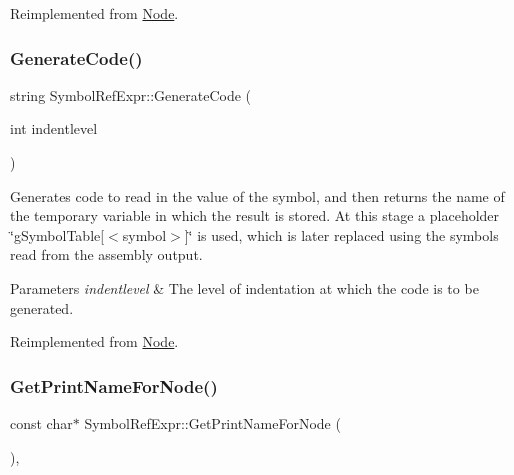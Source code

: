 Reimplemented from \hyperlink{class_node_a5f88d55c6f253a29def7ccc443d83d47}{Node}.

\mbox{\label{class_symbol_ref_expr_a05ae76345e624e5c7085f49707685c6e}} 
\subsubsection{\texorpdfstring{Generate\+Code()}{GenerateCode()}}
{\footnotesize\ttfamily string Symbol\+Ref\+Expr\+::\+Generate\+Code (\begin{DoxyParamCaption}\item[{int}]{indentlevel }\end{DoxyParamCaption})\hspace{0.3cm}{\ttfamily [virtual]}}

Generates code to read in the value of the symbol, and then returns the name of the temporary variable in which the result is stored. At this stage a placeholder \char`\"{}g\+Symbol\+Table\mbox{[}$<$symbol$>$\mbox{]}\char`\"{} is used, which is later replaced using the symbols read from the assembly output. 
\begin{DoxyParams}{Parameters}
{\em indentlevel} & The level of indentation at which the code is to be generated. \\
\hline
\end{DoxyParams}


Reimplemented from \hyperlink{class_node_acb60e526730e8436056375a3055c2c32}{Node}.

\mbox{\label{class_symbol_ref_expr_adc3249d1505c60488bf5dc22d23f462b}} 
\subsubsection{\texorpdfstring{Get\+Print\+Name\+For\+Node()}{GetPrintNameForNode()}}
{\footnotesize\ttfamily const char$\ast$ Symbol\+Ref\+Expr\+::\+Get\+Print\+Name\+For\+Node (\begin{DoxyParamCaption}{ }\end{DoxyParamCaption})\hspace{0.3cm}{\ttfamily [inline]}, {\ttfamily [virtual]}}

